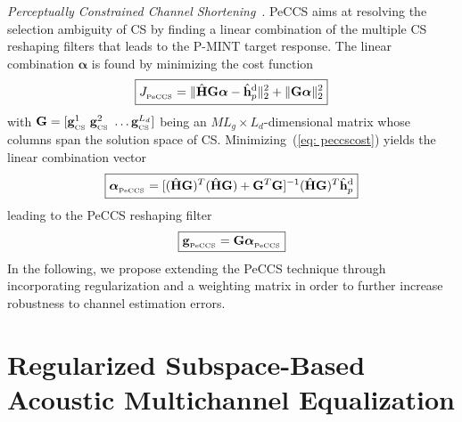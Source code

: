 \documentclass{article}
\begin{document}
{\textit{Perceptually Constrained Channel Shortening}}~\cite{Kodrasi_ICASSP_2013}. \enspace
PeCCS aims at resolving the selection ambiguity of CS by finding a linear combination of the multiple CS reshaping filters that leads to the P-MINT target response.
The linear combination $\boldsymbol \alpha$ is found by minimizing the cost function
\begin{equation}
\label{eq: peccscost}
 \boxed{J_{_{\rm PeCCS}} =  \|\hat{\mathbf{H}}\mathbf{G} \boldsymbol \alpha - \hat{\mathbf{h}}_p^{\rm d} \|_2^2 + \|\mathbf{G} \boldsymbol \alpha \|_2^2}
\end{equation}
with $\mathbf{G} = [\mathbf{g}_{_{\rm CS}}^1 \; \mathbf{g}_{_{\rm CS}}^2 \; \ldots \mathbf{g}_{_{\rm CS}}^{L_d}] $ being an $ML_g \times L_d$-dimensional matrix whose columns span the solution space of CS.
Minimizing~(\ref{eq: peccscost}) yields the linear combination vector
\begin{equation}
\boxed{\boldsymbol \alpha_{_{\rm PeCCS}}  = [(\hat{\mathbf{H}}\mathbf{G})^T(\hat{\mathbf{H}}\mathbf{G}) + \mathbf{G}^T\mathbf{G}]^{-1}  (\hat{\mathbf{H}}\mathbf{G})^T \hat{\mathbf{h}}_p^{\rm d}}
\end{equation}
leading to the PeCCS reshaping filter
\begin{equation}
  \label{eq: peccssol}
  \boxed{\mathbf{g}_{_{\rm PeCCS}} = \mathbf{G} \boldsymbol \alpha_{_{\rm PeCCS}}}
\end{equation}
In the following, we propose extending the PeCCS technique through incorporating regularization and a weighting matrix in order to further increase robustness to channel estimation errors.


\vspace{-0.25cm}
\section{Regularized Subspace-Based Acoustic Multichannel Equalization}
\vspace{-0.25cm}
\end{document}
